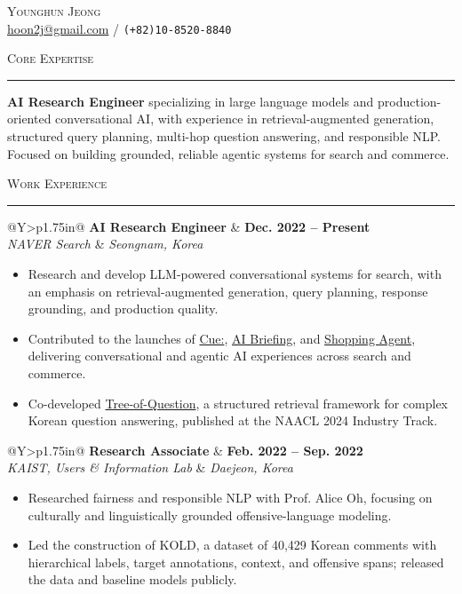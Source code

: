 \documentclass[10pt,letterpaper]{article}
\makeatletter
\newcommand{\sectionheading}[1]{%
  \vspace{12pt}%
  {\fontsize{10.95}{12.5}\selectfont\textsc{#1}}\par
  \vspace{1.5pt}\hrule\vspace{6pt}%
}
\newcommand{\role}[4]{%
  \begin{tabularx}{\textwidth}{@{}Y>{\raggedleft\arraybackslash}p{1.75in}@{}}
    \textbf{#1} & \textbf{#2} \\
    \textit{#3} & \textit{#4}
  \end{tabularx}%
}
\makeatother
\begin{document}
\begin{center}
  {\LARGE\textsc{Younghun Jeong}}\\[3pt]
  \href{mailto:hoon2j@gmail.com}{hoon2j@gmail.com}
  \enspace/\enspace
  \texttt{(+82)10-8520-8840}\\[5pt]
\end{center}

\fontsize{10}{12.2}\selectfont
\vspace{0pt}
\sectionheading{Core Expertise}
\textbf{AI Research Engineer} specializing in large language models and production-oriented conversational AI, with experience in retrieval-augmented generation, structured query planning, multi-hop question answering, and responsible NLP. Focused on building grounded, reliable agentic systems for search and commerce.

\sectionheading{Work Experience}
\role{AI Research Engineer}{Dec. 2022 -- Present}{NAVER Search}{Seongnam, Korea}
\begin{itemize}
  \item Research and develop LLM-powered conversational systems for search, with an emphasis on retrieval-augmented generation, query planning, response grounding, and production quality.
  \item Contributed to the launches of \href{https://cue.search.naver.com}{Cue:}, \href{https://blog.naver.com/naver_search/223807628464}{AI Briefing}, and \href{https://mkt.naver.com/shopping_agent}{Shopping Agent}, delivering conversational and agentic AI experiences across search and commerce.
  \item Co-developed \href{https://aclanthology.org/2024.naacl-industry.35/}{Tree-of-Question}, a structured retrieval framework for complex Korean question answering, published at the NAACL 2024 Industry Track.
\end{itemize}

\vspace{8pt}
\role{Research Associate}{Feb. 2022 -- Sep. 2022}{KAIST, Users \& Information Lab}{Daejeon, Korea}
\begin{itemize}
  \item Researched fairness and responsible NLP with Prof. Alice Oh, focusing on culturally and linguistically grounded offensive-language modeling.
  \item Led the construction of KOLD, a dataset of 40,429 Korean comments with hierarchical labels, target annotations, context, and offensive spans; released the data and baseline models publicly.
\end{itemize}
\end{document}
